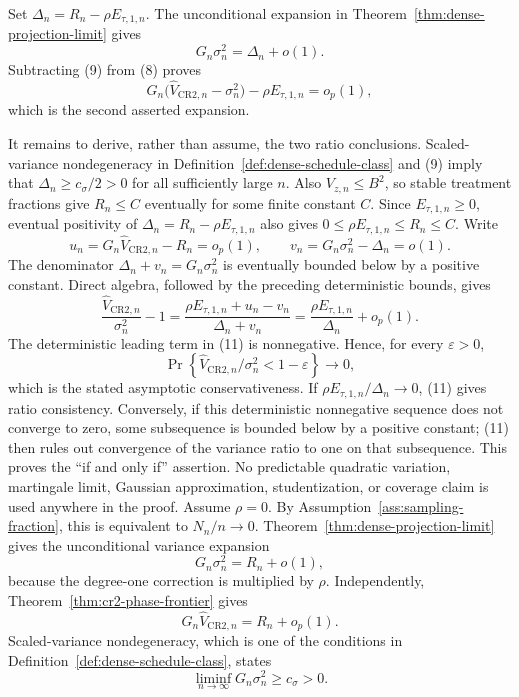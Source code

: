 Set \(\Delta_n=R_n-\rho E_{\tau,1,n}\).  The unconditional expansion in Theorem~\ref{thm:dense-projection-limit} gives
\[
 G_n\sigma_n^2=\Delta_n+o(1).
 \tag{9}
\]
Subtracting (9) from (8) proves
\[
 G_n\bigl(\widehat V_{\mathrm{CR2},n}-\sigma_n^2\bigr)
   -\rho E_{\tau,1,n}=o_p(1),
 \tag{10}
\]
which is the second asserted expansion.

It remains to derive, rather than assume, the two ratio conclusions.  Scaled-variance nondegeneracy in Definition~\ref{def:dense-schedule-class} and (9) imply that \(\Delta_n\ge c_\sigma/2>0\) for all sufficiently large \(n\).  Also \(V_{z,n}\le B^2\), so stable treatment fractions give \(R_n\le C\) eventually for some finite constant \(C\).  Since \(E_{\tau,1,n}\ge0\), eventual positivity of \(\Delta_n=R_n-\rho E_{\tau,1,n}\) also gives \(0\le\rho E_{\tau,1,n}\le R_n\le C\).  Write
\[
 u_n=G_n\widehat V_{\mathrm{CR2},n}-R_n=o_p(1),
 \qquad
 v_n=G_n\sigma_n^2-\Delta_n=o(1).
\]
The denominator \(\Delta_n+v_n=G_n\sigma_n^2\) is eventually bounded below by a positive constant.  Direct algebra, followed by the preceding deterministic bounds, gives
\[
 \frac{\widehat V_{\mathrm{CR2},n}}{\sigma_n^2}-1
 =\frac{\rho E_{\tau,1,n}+u_n-v_n}{\Delta_n+v_n}
 =\frac{\rho E_{\tau,1,n}}{\Delta_n}+o_p(1).
 \tag{11}
\]
The deterministic leading term in (11) is nonnegative.  Hence, for every \(\varepsilon>0\),
\[
 \Pr\!\left\{
   \widehat V_{\mathrm{CR2},n}/\sigma_n^2<1-\varepsilon
 \right\}\longrightarrow0,
\]
which is the stated asymptotic conservativeness.  If \(\rho E_{\tau,1,n}/\Delta_n\to0\), (11) gives ratio consistency.  Conversely, if this deterministic nonnegative sequence does not converge to zero, some subsequence is bounded below by a positive constant; (11) then rules out convergence of the variance ratio to one on that subsequence.  This proves the ``if and only if'' assertion.  No predictable quadratic variation, martingale limit, Gaussian approximation, studentization, or coverage claim is used anywhere in the proof.
Assume \(\rho=0\).  By Assumption~\ref{ass:sampling-fraction}, this is equivalent to \(N_n/n\to0\).  Theorem~\ref{thm:dense-projection-limit} gives the unconditional variance expansion
\[
 G_n\sigma_n^2=R_n+o(1),
 \tag{1}
\]
because the degree-one correction is multiplied by \(\rho\).  Independently, Theorem~\ref{thm:cr2-phase-frontier} gives
\[
 G_n\widehat V_{\mathrm{CR2},n}=R_n+o_p(1).
 \tag{2}
\]
Scaled-variance nondegeneracy, which is one of the conditions in Definition~\ref{def:dense-schedule-class}, states
\[
 \liminf_{n\to\infty}G_n\sigma_n^2\ge c_\sigma>0.
\]
